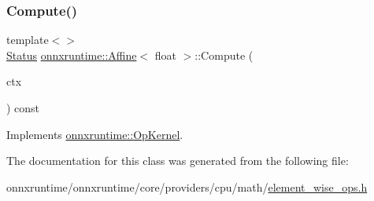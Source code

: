 \subsubsection{\texorpdfstring{Compute()}{Compute()}\hspace{0.1cm}{\footnotesize\ttfamily [2/2]}}
{\footnotesize\ttfamily template$<$$>$ \\
\mbox{\hyperlink{classonnxruntime_1_1common_1_1Status}{Status}} \mbox{\hyperlink{classonnxruntime_1_1Affine}{onnxruntime\+::\+Affine}}$<$ float $>$\+::Compute (\begin{DoxyParamCaption}\item[{\mbox{\hyperlink{classonnxruntime_1_1OpKernelContext}{Op\+Kernel\+Context}} $\ast$}]{ctx }\end{DoxyParamCaption}) const\hspace{0.3cm}{\ttfamily [virtual]}}



Implements \mbox{\hyperlink{classonnxruntime_1_1OpKernel_a9eca8656a78b1b3ab9d3351a12798650}{onnxruntime\+::\+Op\+Kernel}}.



The documentation for this class was generated from the following file\+:\begin{DoxyCompactItemize}
\item 
onnxruntime/onnxruntime/core/providers/cpu/math/\mbox{\hyperlink{element__wise__ops_8h}{element\+\_\+wise\+\_\+ops.\+h}}\end{DoxyCompactItemize}
